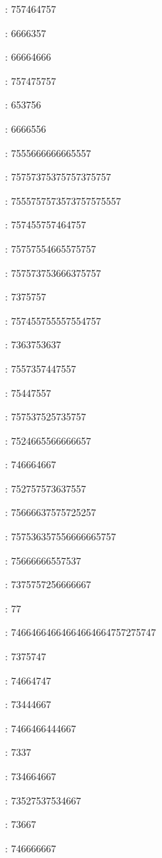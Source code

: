 : 757464757\par
{}: 6666357\par
{}: 66664666\par
{}: 757475757\par
{}: 653756\par
{}: 6666556\par
{}: 7555666666665557\par
{}: 75757375375757375757\par
{}: 7555757573573757575557\par
{}: 757455757464757\par
{}: 75757554665575757\par
{}: 757573753666375757\par
{}: 7375757\par
{}: 757455755557554757\par
{}: 7363753637\par
{}: 7557357447557\par
{}: 75447557\par
{}: 757537525735757\par
{}: 7524665566666657\par
{}: 746664667\par
{}: 752757573637557\par
{}: 75666637575725257\par
{}: 757536357556666665757\par
{}: 75666666557537\par
{}: 7375757256666667\par
{}: 77\par
{}: 74664664664664664664757275747\par
{}: 7375747\par
{}: 74664747\par
{}: 73444667\par
{}: 7466466444667\par
{}: 7337\par
{}: 734664667\par
{}: 73527537534667\par
{}: 73667\par
{}: 746666667\par
